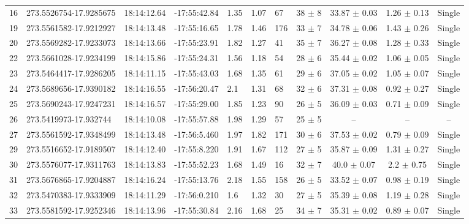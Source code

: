 \documentclass[longauth]{aa} %
\begin{document}
\begin{appendix}
\begin{table}[htbp!]
\begin{tabular}{llllllllccc}
16  &  273.5526754-17.9285675  &  18:14:12.64  &  -17:55:42.84  &  1.35  &  1.07  &  67  &  38 $\pm$ 8  &  33.87 $\pm$ 0.03  &  1.26 $\pm$ 0.13  &  Single \\
19  &  273.5561582-17.9212927  &  18:14:13.48  &  -17:55:16.65  &  1.78  &  1.46  &  176  &  33 $\pm$ 7  &  34.78 $\pm$ 0.06  &  1.43 $\pm$ 0.26  &  Single \\
20  &  273.5569282-17.9233073  &  18:14:13.66  &  -17:55:23.91  &  1.82  &  1.27  &  41  &  35 $\pm$ 7  &  36.27 $\pm$ 0.08  &  1.28 $\pm$ 0.33  &  Single \\
22  &  273.5661028-17.9234199  &  18:14:15.86  &  -17:55:24.31  &  1.56  &  1.18  &  54  &  28 $\pm$ 6  &  35.44 $\pm$ 0.02  &  1.06 $\pm$ 0.05  &  Single \\
23  &  273.5464417-17.9286205  &  18:14:11.15  &  -17:55:43.03  &  1.68  &  1.35  &  61  &  29 $\pm$ 6  &  37.05 $\pm$ 0.02  &  1.05 $\pm$ 0.07  &  Single \\
24  &  273.5689656-17.9390182  &  18:14:16.55  &  -17:56:20.47  &  2.1  &  1.31  &  68  &  32 $\pm$ 6  &  37.31 $\pm$ 0.08  &  0.92 $\pm$ 0.27  &  Single \\
25  &  273.5690243-17.9247231  &  18:14:16.57  &  -17:55:29.00  &  1.85  &  1.23  &  90  &  26 $\pm$ 5  &  36.09 $\pm$ 0.03  &  0.71 $\pm$ 0.09  &  Single \\
26  &  273.5419973-17.932744  &  18:14:10.08  &  -17:55:57.88  &  1.98  &  1.29  &  57  &  25 $\pm$ 5  &  --  &  --  &  -- \\
27  &  273.5561592-17.9348499  &  18:14:13.48  &  -17:56:5.460  &  1.97  &  1.82  &  171  &  30 $\pm$ 6  &  37.53 $\pm$ 0.02  &  0.79 $\pm$ 0.09  &  Single \\
29  &  273.5516652-17.9189507  &  18:14:12.40  &  -17:55:8.220  &  1.91  &  1.67  &  112  &  27 $\pm$ 5  &  35.87 $\pm$ 0.09  &  1.31 $\pm$ 0.27  &  Single \\
30  &  273.5576077-17.9311763  &  18:14:13.83  &  -17:55:52.23  &  1.68  &  1.49  &  16  &  32 $\pm$ 7  &  40.0 $\pm$ 0.07  &  2.2 $\pm$ 0.75  &  Single \\
31  &  273.5676865-17.9204887  &  18:14:16.24  &  -17:55:13.76  &  2.18  &  1.55  &  158  &  26 $\pm$ 5  &  33.52 $\pm$ 0.07  &  0.98 $\pm$ 0.19  &  Single \\
32  &  273.5470383-17.9333909  &  18:14:11.29  &  -17:56:0.210  &  1.6  &  1.32  &  30  &  27 $\pm$ 5  &  35.39 $\pm$ 0.08  &  1.19 $\pm$ 0.28  &  Single \\
33  &  273.5581592-17.9252346  &  18:14:13.96  &  -17:55:30.84  &  2.16  &  1.68  &  25  &  34 $\pm$ 7  &  35.31 $\pm$ 0.02  &  0.89 $\pm$ 0.07  &  Single \\

\end{tabular}
\end{table}
\end{appendix}
\end{document}
